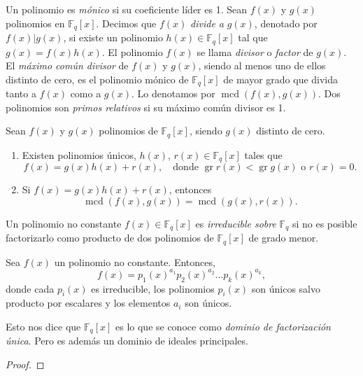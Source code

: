 Un polinomio es \textit{mónico} si su coeficiente líder es 1.
Sean \(f(x)\) y \(g(x)\) polinomios en \(\mathbb F_q[x]\).
Decimos que \(f(x)\) \textit{divide a} \(g(x)\), denotado por \(f(x) | g(x)\), si existe un polinomio \(h(x) \in \mathbb F_q[x]\) tal que \(g(x) = f(x)h(x)\).
El polinomio \(f(x)\) se llama \textit{divisor} o \textit{factor} de \(g(x)\).
El \textit{máximo común divisor} de \(f(x)\) y \(g(x)\), siendo al menos uno de ellos distinto de cero, es el polinomio mónico de \(\mathbb F_q[x]\) de mayor grado que divida tanto a \(f(x)\) como a \(g(x)\).
Lo denotamos por \(\operatorname{mcd}(f(x), g(x))\).
Dos polinomios son \textit{primos relativos} si su máximo común divisor es 1.



\begin{theorem}
  Sean \(f(x)\) y \(g(x)\) polinomios de \(\mathbb F_q[x]\), siendo \(g(x)\) distinto de cero.
  \begin{enumerate}
    \item Existen polinomios únicos, \(h(x)\), \(r(x) \in \mathbb F_q[x]\) tales que \[
      f(x) = g(x)h(x) + r(x), \quad \text{donde } \operatorname{gr} r(x) < \operatorname{gr} g(x) \text{ o } r(x) = 0. 
    \]
    \item Si \(f(x) = g(x)h(x) + r(x)\), entonces \[\operatorname{mcd}(f(x), g(x)) = \operatorname{mcd}(g(x), r(x)).\]
  \end{enumerate}
\end{theorem}


Un polinomio no constante \(f(x) \in \mathbb F_q[x]\) es \textit{irreducible sobre} \(\mathbb F_q\) si no es posible factorizarlo como producto de dos polinomios de \(\mathbb F_q[x]\) de grado menor.

\begin{theorem}
  Sea \(f(x)\) un polinomio no constante. Entonces, 
  \[
    f(x) = p_1(x)^{a_1}p_2(x)^{a_2}\dots p_k(x)^{a_k},
  \]
  donde cada \(p_i(x)\) es irreducible, los polinomios \(p_i(x)\) son únicos salvo producto por escalares y los elementos \(a_i\) son únicos.
\end{theorem}

Esto nos dice que \(\mathbb F_q[x]\) es lo que se conoce como \textit{dominio de factorización única}.
Pero es además un dominio de ideales principales.

\begin{proof}
\end{proof}

